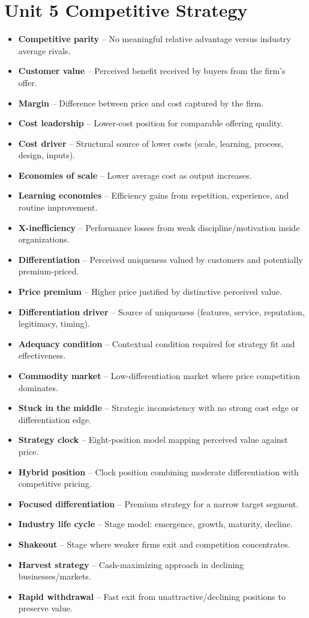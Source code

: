 \documentclass[10pt,a4paper]{article}
\newcommand{\vocab}[2]{\item \textbf{\textcolor{pinkmain}{#1}} -- #2}
\begin{document}
\section*{Unit 5 Competitive Strategy}
\begin{itemize}
\vocab{Competitive parity}{No meaningful relative advantage versus industry average rivals.}
\vocab{Customer value}{Perceived benefit received by buyers from the firm's offer.}
\vocab{Margin}{Difference between price and cost captured by the firm.}
\vocab{Cost leadership}{Lower-cost position for comparable offering quality.}
\vocab{Cost driver}{Structural source of lower costs (scale, learning, process, design, inputs).}
\vocab{Economies of scale}{Lower average cost as output increases.}
\vocab{Learning economies}{Efficiency gains from repetition, experience, and routine improvement.}
\vocab{X-inefficiency}{Performance losses from weak discipline/motivation inside organizations.}
\vocab{Differentiation}{Perceived uniqueness valued by customers and potentially premium-priced.}
\vocab{Price premium}{Higher price justified by distinctive perceived value.}
\vocab{Differentiation driver}{Source of uniqueness (features, service, reputation, legitimacy, timing).}
\vocab{Adequacy condition}{Contextual condition required for strategy fit and effectiveness.}
\vocab{Commodity market}{Low-differentiation market where price competition dominates.}
\vocab{Stuck in the middle}{Strategic inconsistency with no strong cost edge or differentiation edge.}
\vocab{Strategy clock}{Eight-position model mapping perceived value against price.}
\vocab{Hybrid position}{Clock position combining moderate differentiation with competitive pricing.}
\vocab{Focused differentiation}{Premium strategy for a narrow target segment.}
\vocab{Industry life cycle}{Stage model: emergence, growth, maturity, decline.}
\vocab{Shakeout}{Stage where weaker firms exit and competition concentrates.}
\vocab{Harvest strategy}{Cash-maximizing approach in declining businesses/markets.}
\vocab{Rapid withdrawal}{Fast exit from unattractive/declining positions to preserve value.}
\end{itemize}
\end{document}
